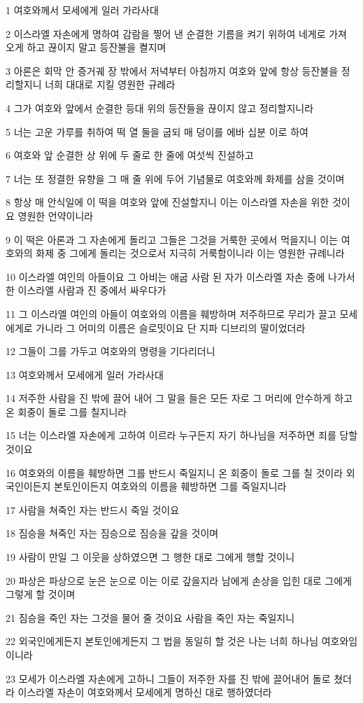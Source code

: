 \par 1 여호와께서 모세에게 일러 가라사대
\par 2 이스라엘 자손에게 명하여 감람을 찧어 낸 순결한 기름을 켜기 위하여 네게로 가져 오게 하고 끊이지 말고 등잔불을 켤지며
\par 3 아론은 회막 안 증거궤 장 밖에서 저녁부터 아침까지 여호와 앞에 항상 등잔불을 정리할지니 너희 대대로 지킬 영원한 규례라
\par 4 그가 여호와 앞에서 순결한 등대 위의 등잔들을 끊이지 않고 정리할지니라
\par 5 너는 고운 가루를 취하여 떡 열 둘을 굽되 매 덩이를 에바 십분 이로 하여
\par 6 여호와 앞 순결한 상 위에 두 줄로 한 줄에 여섯씩 진설하고
\par 7 너는 또 정결한 유향을 그 매 줄 위에 두어 기념물로 여호와께 화제를 삼을 것이며
\par 8 항상 매 안식일에 이 떡을 여호와 앞에 진설할지니 이는 이스라엘 자손을 위한 것이요 영원한 언약이니라
\par 9 이 떡은 아론과 그 자손에게 돌리고 그들은 그것을 거룩한 곳에서 먹을지니 이는 여호와의 화제 중 그에게 돌리는 것으로서 지극히 거룩함이니라 이는 영원한 규례니라
\par 10 이스라엘 여인의 아들이요 그 아비는 애굽 사람 된 자가 이스라엘 자손 중에 나가서 한 이스라엘 사람과 진 중에서 싸우다가
\par 11 그 이스라엘 여인의 아들이 여호와의 이름을 훼방하며 저주하므로 무리가 끌고 모세에게로 가니라 그 어미의 이름은 슬로밋이요 단 지파 디브리의 딸이었더라
\par 12 그들이 그를 가두고 여호와의 명령을 기다리더니
\par 13 여호와께서 모세에게 일러 가라사대
\par 14 저주한 사람을 진 밖에 끌어 내어 그 말을 들은 모든 자로 그 머리에 안수하게 하고 온 회중이 돌로 그를 칠지니라
\par 15 너는 이스라엘 자손에게 고하여 이르라 누구든지 자기 하나님을 저주하면 죄를 당할 것이요
\par 16 여호와의 이름을 훼방하면 그를 반드시 죽일지니 온 회중이 돌로 그를 칠 것이라 외국인이든지 본토인이든지 여호와의 이름을 훼방하면 그를 죽일지니라
\par 17 사람을 쳐죽인 자는 반드시 죽일 것이요
\par 18 짐승을 쳐죽인 자는 짐승으로 짐승을 갚을 것이며
\par 19 사람이 만일 그 이웃을 상하였으면 그 행한 대로 그에게 행할 것이니
\par 20 파상은 파상으로 눈은 눈으로 이는 이로 갚을지라 남에게 손상을 입힌 대로 그에게 그렇게 할 것이며
\par 21 짐승을 죽인 자는 그것을 물어 줄 것이요 사람을 죽인 자는 죽일지니
\par 22 외국인에게든지 본토인에게든지 그 법을 동일히 할 것은 나는 너희 하나님 여호와임이니라
\par 23 모세가 이스라엘 자손에게 고하니 그들이 저주한 자를 진 밖에 끌어내어 돌로 쳤더라 이스라엘 자손이 여호와께서 모세에게 명하신 대로 행하였더라

